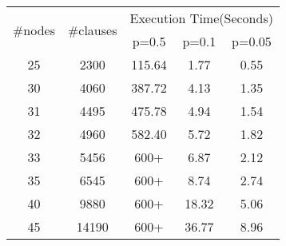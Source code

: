 \begin{figure}[htp]

\begin{center}
  \begin{tabular}{ | c | c | c | c | c | }
    \hline
    \multirow{2}{*}{\#nodes} & \multirow{2}{*}{\#clauses} & \multicolumn{3}{|c|}{Execution Time(Seconds)} \\ \cline{3-5}
      	&  & p=0.5 & p=0.1 & p=0.05   \\ \hline
	25 & 2300 & 115.64 & 1.77 & 0.55   \\ \hline
	30 & 4060 & 387.72 & 4.13 & 1.35   \\ \hline
	31 & 4495 & 475.78 & 4.94 & 1.54   \\ \hline
	32 & 4960 & 582.40 & 5.72 & 1.82   \\ \hline
	33 & 5456 & 600+ & 6.87 & 2.12   \\ \hline
	35 & 6545 & 600+ & 8.74 & 2.74  \\ \hline
	40 & 9880 & 600+ & 18.32 & 5.06  \\ \hline
	45 & 14190 & 600+ & 36.77 & 8.96  \\ \hline

\end{tabular}
\end{center}
\end{figure}

